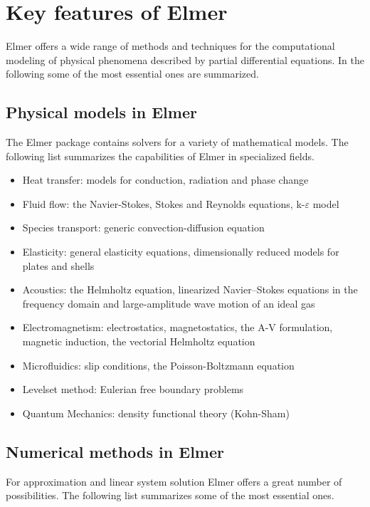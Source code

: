 \section{Key features of Elmer}

Elmer offers a wide range of methods and techniques for the computational modeling of
physical phenomena described by partial differential equations.
In the following some of the most essential ones are summarized.

\subsection*{Physical models in Elmer}
The Elmer package contains solvers for a variety of mathematical models.
The following list summarizes the capabilities of Elmer in specialized fields.
\begin{itemize}
  \item Heat transfer: models for conduction, radiation and phase change
  \item Fluid flow: the Navier-Stokes, Stokes and Reynolds equations, k-$\varepsilon$ model
  \item Species transport: generic convection-diffusion equation
  \item Elasticity: general elasticity equations, dimensionally reduced models for plates and shells
  \item Acoustics: the Helmholtz equation, linearized Navier--Stokes equations in the frequency domain and
    large-amplitude wave motion of an ideal gas
  \item Electromagnetism: electrostatics, magnetostatics, the A-V formulation, magnetic induction, the vectorial Helmholtz equation 
  \item Microfluidics: slip conditions, the Poisson-Boltzmann equation
  \item Levelset method: Eulerian free boundary problems 
  \item Quantum Mechanics: density functional theory (Kohn-Sham)
\end{itemize}

\subsection*{Numerical methods in Elmer}

For approximation and linear system solution Elmer offers a great number of possibilities.
The following list summarizes some of the most essential ones.

